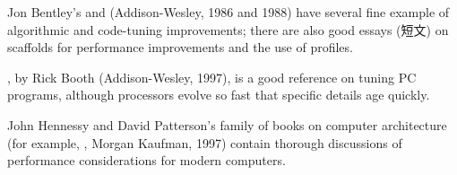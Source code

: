 Jon Bentley's  and  (Addison-Wesley, 1986 and 1988) have several fine example of
algorithmic and code-tuning improvements; there are also good essays (短文)
on scaffolds for performance improvements and the use of profiles.

, by Rick Booth (Addison-Wesley, 1997), is a good
reference on tuning PC programs, although processors evolve so fast that
specific details age quickly.

John Hennessy and David Patterson's family of books on computer
architecture (for example, , Morgan Kaufman, 1997) contain thorough
discussions of performance considerations for modern computers.


